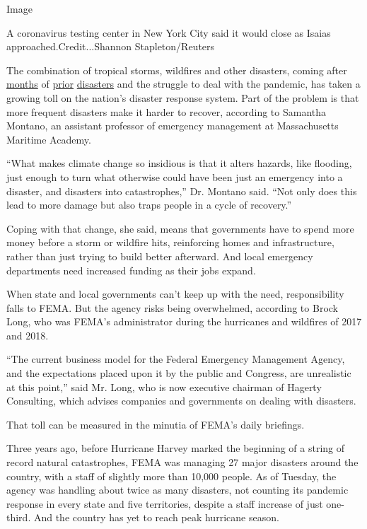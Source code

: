 Image

A coronavirus testing center in New York City said it would close as
Isaias approached.Credit...Shannon Stapleton/Reuters

The combination of tropical storms, wildfires and other disasters,
coming after
\href{https://www.nytimes3xbfgragh.onion/2020/05/20/us/michigan-flooding-dams-midland.html}{months}
of
\href{https://www.nytimes3xbfgragh.onion/2020/04/13/us/tornado-storm-south.html}{prior}
\href{https://www.nytimes3xbfgragh.onion/2020/01/11/us/winter-storm-tornadoes.html}{disasters}
and the struggle to deal with the pandemic, has taken a growing toll on
the nation's disaster response system. Part of the problem is that more
frequent disasters make it harder to recover, according to Samantha
Montano, an assistant professor of emergency management at Massachusetts
Maritime Academy.

``What makes climate change so insidious is that it alters hazards, like
flooding, just enough to turn what otherwise could have been just an
emergency into a disaster, and disasters into catastrophes,'' Dr.
Montano said. ``Not only does this lead to more damage but also traps
people in a cycle of recovery.''

Coping with that change, she said, means that governments have to spend
more money before a storm or wildfire hits, reinforcing homes and
infrastructure, rather than just trying to build better afterward. And
local emergency departments need increased funding as their jobs expand.

When state and local governments can't keep up with the need,
responsibility falls to FEMA. But the agency risks being overwhelmed,
according to Brock Long, who was FEMA's administrator during the
hurricanes and wildfires of 2017 and 2018.

``The current business model for the Federal Emergency Management
Agency, and the expectations placed upon it by the public and Congress,
are unrealistic at this point,'' said Mr. Long, who is now executive
chairman of Hagerty Consulting, which advises companies and governments
on dealing with disasters.

That toll can be measured in the minutia of FEMA's daily briefings.

Three years ago, before Hurricane Harvey marked the beginning of a
string of record natural catastrophes, FEMA was managing 27 major
disasters around the country, with a staff of slightly more than 10,000
people. As of Tuesday, the agency was handling about twice as many
disasters, not counting its pandemic response in every state and five
territories, despite a staff increase of just one-third. And the country
has yet to reach peak hurricane season.

